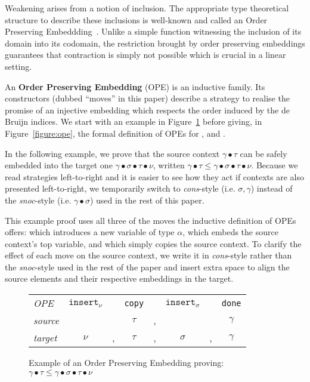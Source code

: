 Weakening arises from a notion of inclusion. The appropriate type
theoretical structure to describe these inclusions is well-known
and called an Order Preserving Embeddding~\cite{chapman2009thesis,altenkirch1995categorical}.
Unlike a simple function witnessing the inclusion of its domain
into its codomain, the restriction brought by order preserving
embeddings guarantees that contraction is simply not possible which
is crucial in a linear setting.

\begin{definition}
An \textbf{Order Preserving Embedding} (OPE) is an inductive family. Its
constructors (dubbed ``moves'' in this paper) describe a strategy to realise
the promise of an injective embedding which respects the order induced by
the de Bruijn indices. We start with an example in Figure~\ref{figure:exampleOpe}
before giving, in Figure~\ref{figure:ope}, the formal definition of OPEs for
\Nat{}, \Context{} and \Usages{}.
\end{definition}

In the following example, we prove that the source context $\gamma ∙ \tau$
can be safely embedded into the target one $\gamma ∙ \sigma ∙ \tau ∙ \nu$,
written $\gamma ∙ \tau \leq \gamma ∙ \sigma ∙ \tau ∙ \nu$. Because we read
strategies left-to-right and it is easier to see how they act if contexts
are also presented left-to-right, we temporarily switch to \emph{cons}-style
(i.e. $\sigma , \gamma$) instead of the \emph{snoc}-style (i.e. $\gamma ∙ \sigma$)
used in the rest of this paper.

This example proof uses all three of the moves the inductive definition of
OPEs offers: \opeinsert{\alpha} which introduces a new variable of type
$\alpha$, \opecopy{} which embeds the source context's top variable,
and \opedone{} which simply copies the source context. To clarify the
effect of each move on the source context, we write it in \textit{cons}-style
rather than the \textit{snoc}-style used in the rest of the paper and insert
extra space to align the source elements and their respective embeddings in
the target.

\begin{figure}[ht]\centering
\begin{tabular}{l|ccccccc}
\textit{OPE} & $\texttt{insert}_{\nu}$ &
             & \texttt{copy} &
             & $\texttt{insert}_{\sigma}$ &
             & \texttt{done}\\
\textit{source} & &
                & $\tau$ & ,
                & &
                & $\gamma$ \\
\textit{target} & $\nu$ & ,
                & $\tau$ & ,
                & $\sigma$ & ,
                & $\gamma$ \\
\end{tabular}
\caption{Example of an Order Preserving Embedding proving:
         $\gamma ∙ \tau
          \leq
          \gamma ∙ \sigma ∙ \tau ∙ \nu$\label{figure:exampleOpe}}
\end{figure}

